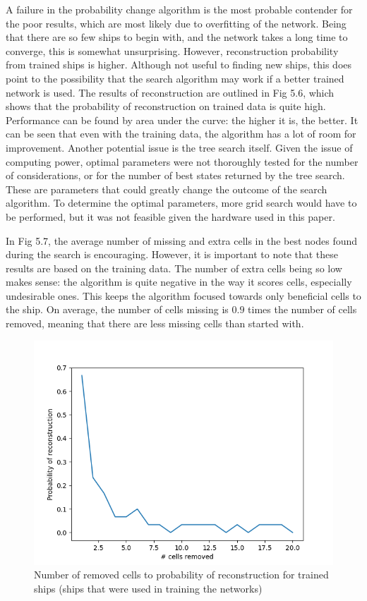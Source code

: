 \documentclass{l4proj}
\begin{document}
A failure in the probability change algorithm is the most probable contender for the poor results, which are most likely due to overfitting of the network. Being that there are so few ships to begin with, and the network takes a long time to converge, this is somewhat unsurprising. However, reconstruction probability from trained ships is higher. Although not useful to finding new ships, this does point to the possibility that the search algorithm may work if a better trained network is used. The results of reconstruction are outlined in Fig 5.6, which shows that the probability of reconstruction on trained data is quite high. Performance can be found by area under the curve: the higher it is, the better. It can be seen that even with the training data, the algorithm has a lot of room for improvement. Another potential issue is the tree search itself. Given the issue of computing power, optimal parameters were not thoroughly tested for the number of considerations, or for the number of best states returned by the tree search. These are parameters that could greatly change the outcome of the search algorithm. To determine the optimal parameters, more grid search would have to be performed, but it was not feasible given the hardware used in this paper. 

In Fig 5.7, the average number of missing and extra cells in the best nodes found during the search is encouraging. However, it is important to note that these results are based on the training data. The number of extra cells being so low makes sense: the algorithm is quite negative in the way it scores cells, especially undesirable ones. This keeps the algorithm focused towards only beneficial cells to the ship. On average, the number of cells missing is $0.9$ times the number of cells removed, meaning that there are less missing cells than started with. 

\begin{figure}[h!]
\centering
\includegraphics[width=0.8\linewidth]{dissertation/images/graphs/probability_of_reconstruction_against_damage_trained.png}
\caption{Number of removed cells to probability of reconstruction for trained ships (ships that were used in training the networks)}
\label{fig:subim1}
\end{figure}
\end{document}
